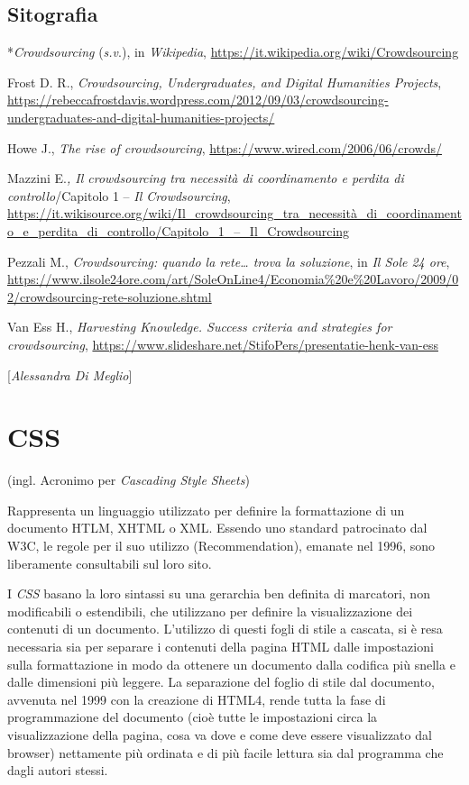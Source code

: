 \section*{Sitografia}
{\parindent0pt 
*\emph{Crowdsourcing} (\emph{s.v}.), in \emph{Wikipedia},
\url{https://it.wikipedia.org/wiki/Crowdsourcing}

Frost D. R., \emph{Crowdsourcing, Undergraduates, and Digital Humanities
Projects},
\url{https://rebeccafrostdavis.wordpress.com/2012/09/03/crowdsourcing-undergraduates-and-digital-humanities-projects/}

Howe J., \emph{The rise of crowdsourcing},
\url{https://www.wired.com/2006/06/crowds/}

Mazzini E.\emph{, Il crowdsourcing tra necessità di coordinamento e
perdita di controllo}/Capitolo 1 -- \emph{Il Crowdsourcing},
\url{https://it.wikisource.org/wiki/Il_crowdsourcing_tra_necessità_di_coordinamento_e_perdita_di_controllo/Capitolo_1_–_Il_Crowdsourcing}

Pezzali M., \emph{Crowdsourcing: quando la rete\ldots{} trova la
soluzione}, in \emph{Il Sole 24 ore},
\url{https://www.ilsole24ore.com/art/SoleOnLine4/Economia\%20e\%20Lavoro/2009/02/crowdsourcing-rete-soluzione.shtml}

Van Ess H., \emph{Harvesting Knowledge. Success criteria and strategies
for crowdsourcing},
\url{https://www.slideshare.net/StifoPers/presentatie-henk-van-ess}
}

\hrulefill 

{[}\emph{Alessandra Di Meglio}{]}

\chapter{CSS}

(ingl. Acronimo per \emph{Cascading Style Sheets})

Rappresenta un linguaggio utilizzato per definire la formattazione di un
documento HTLM, XHTML o XML. Essendo uno standard patrocinato dal W3C,
le regole per il suo utilizzo (Recommendation), emanate nel 1996, sono
liberamente consultabili sul loro sito.

I \emph{CSS} basano la loro sintassi su una gerarchia ben definita di
marcatori, non modificabili o estendibili, che utilizzano per definire
la visualizzazione dei contenuti di un documento. L'utilizzo di questi
fogli di stile a cascata, si è resa necessaria sia per separare i
contenuti della pagina HTML dalle impostazioni sulla formattazione in
modo da ottenere un documento dalla codifica più snella e dalle
dimensioni più leggere. La separazione del foglio di stile dal
documento, avvenuta nel 1999 con la creazione di HTML4, rende tutta la
fase di programmazione del documento (cioè tutte le impostazioni circa
la visualizzazione della pagina, cosa va dove e come deve essere
visualizzato dal browser) nettamente più ordinata e di più facile
lettura sia dal programma che dagli autori stessi.

